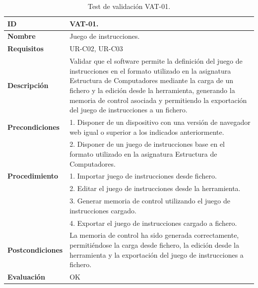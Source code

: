 \begin{center}
\begin{table}[htb]
\centering
\begin{tabular}{@{}p{2.5cm} p{9cm}@{}} 
\toprule
\textbf{ID} 					& VAT-01. \\
\midrule
\textbf{Nombre} 				& Juego de instrucciones. \\
\midrule
\textbf{Requisitos} 		& UR-C02, UR-C03 \\
\midrule
\textbf{Descripción} 		& Validar que el software permite la definición del juego de instrucciones en el formato utilizado en la asignatura Estructura de Computadores mediante la carga de un fichero y la edición desde la herramienta, generando la memoria de control asociada y permitiendo la exportación del juego de instrucciones a un fichero. \\
\midrule
\textbf{Precondiciones}		& 1. Disponer de un dispositivo con una versión de navegador web igual o superior a los indicados anteriormente. \\
											& 2. Disponer de un juego de instrucciones base en el formato utilizado en la asignatura Estructura de Computadores. \\
\midrule
\textbf{Procedimiento}		& 1. Importar juego de instrucciones desde fichero.\\
											& 2. Editar el juego de instrucciones desde la herramienta.\\
											& 3. Generar memoria de control utilizando el juego de instrucciones cargado.\\
											& 4. Exportar el juego de instrucciones cargado a fichero. \\
\midrule
\textbf{Postcondiciones} 		&  La memoria de control ha sido generada correctamente, permitiéndose la carga desde fichero, la edición desde la herramienta y la exportación del juego de instrucciones a fichero.\\
\midrule
\textbf{Evaluación} 			& OK \\
\bottomrule
\end{tabular}
\caption{Test de validación VAT-01.}
\label{tab:vat-01}
\end{table}
\end{center}


